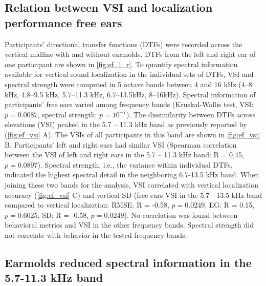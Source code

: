 \subsection{Relation between VSI and localization performance free ears}
Participants' directional transfer functions (DTFs) were recorded across the vertical midline with and without earmolds. DTFs from the left and right ear of one participant are shown in \cref{fig:ef_l_r}. To quantify spectral information available for vertical sound localization in the individual sets of DTFs, VSI \citep{trapeau_fast_2016} and spectral strength \citep{middlebrooks_individual_1999} were computed in 5 octave bands between 4 and 16 kHz (4–8 kHz, 4.8–9.5 kHz, 5.7–11.3 kHz, 6.7–13.5kHz, 8–16kHz). Spectral information of participants’ free ears varied among frequency bands (Kruskal-Wallis test, VSI: $p = 0.0087$, spectral strength: $p = 10^{-7}$). The dissimilarity between DTFs across elevations (VSI) peaked in the 5.7 – 11.3 kHz band as previously reported by \citet{trapeau_fast_2016} (\cref{fig:ef_vsi} A). The VSIs of all participants in this band are shown in \cref{fig:ef_vsi} B. Participants' left and right ears had similar VSI (Spearman correlation between the VSI of left and right ears in the 5.7 – 11.3 kHz band: R = 0.45, $p = 0.0897$). Spectral strength, i.e., the variance within individual DTFs, indicated the highest spectral detail in the neighboring 6.7-13.5 kHz band. When joining these two bands for the analysis, VSI correlated with vertical localization accuracy (\cref{fig:ef_vsi} C) and vertical SD (free ears VSI in the 5.7 - 13.5 kHz band compared to vertical localization: RMSE: R = -0.58, $p = 0.0249$, EG: R = 0.15, $p = 0.6025$, SD: R = -0.58, $p = 0.0249$). No correlation was found between behavioral metrics and VSI in the other frequency bands. Spectral strength did not correlate with behavior in the tested frequency bands.

\subsection{Earmolds reduced spectral information in the 5.7-11.3 kHz band}

